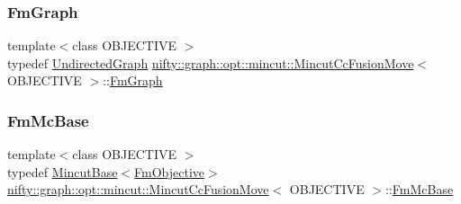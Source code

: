 \mbox{\label{classnifty_1_1graph_1_1opt_1_1mincut_1_1MincutCcFusionMove_a5ae3c9a6e16601c6de022f74b7600a2d}} 
\subsubsection{\texorpdfstring{Fm\+Graph}{FmGraph}}
{\footnotesize\ttfamily template$<$class O\+B\+J\+E\+C\+T\+I\+VE $>$ \\
typedef \hyperlink{classnifty_1_1graph_1_1UndirectedGraph}{Undirected\+Graph} \hyperlink{classnifty_1_1graph_1_1opt_1_1mincut_1_1MincutCcFusionMove}{nifty\+::graph\+::opt\+::mincut\+::\+Mincut\+Cc\+Fusion\+Move}$<$ O\+B\+J\+E\+C\+T\+I\+VE $>$\+::\hyperlink{classnifty_1_1graph_1_1opt_1_1mincut_1_1MincutCcFusionMove_a5ae3c9a6e16601c6de022f74b7600a2d}{Fm\+Graph}}

\mbox{\label{classnifty_1_1graph_1_1opt_1_1mincut_1_1MincutCcFusionMove_a549fea9f9966d8fd033328c33c5bc7cd}} 
\subsubsection{\texorpdfstring{Fm\+Mc\+Base}{FmMcBase}}
{\footnotesize\ttfamily template$<$class O\+B\+J\+E\+C\+T\+I\+VE $>$ \\
typedef \hyperlink{classnifty_1_1graph_1_1opt_1_1mincut_1_1MincutBase}{Mincut\+Base}$<$\hyperlink{classnifty_1_1graph_1_1opt_1_1mincut_1_1MincutCcFusionMove_a5f30047aa697335e354346a6c1c2f8ad}{Fm\+Objective}$>$ \hyperlink{classnifty_1_1graph_1_1opt_1_1mincut_1_1MincutCcFusionMove}{nifty\+::graph\+::opt\+::mincut\+::\+Mincut\+Cc\+Fusion\+Move}$<$ O\+B\+J\+E\+C\+T\+I\+VE $>$\+::\hyperlink{classnifty_1_1graph_1_1opt_1_1mincut_1_1MincutCcFusionMove_a549fea9f9966d8fd033328c33c5bc7cd}{Fm\+Mc\+Base}}

